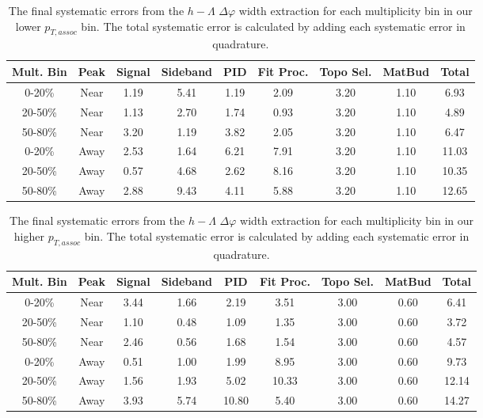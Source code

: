 \documentclass[ALICE,manyauthors]{ALICE_analysis_notes}
\begin{document}
\begin{table}[ht]
\centering
\begin{tabular}{|c|c||c|c|c|c|c|c||c|}
\hline
Mult. Bin & Peak & Signal & Sideband & PID & Fit Proc. & Topo Sel. & MatBud & Total \\
\hline
0-20\% & Near & 1.19 & 5.41 & 1.19 & 2.09 & 3.20 & 1.10 & 6.93 \\
20-50\% & Near & 1.13 & 2.70 & 1.74 & 0.93 & 3.20 & 1.10 & 4.89 \\
50-80\% & Near & 3.20 & 1.19 & 3.82 & 2.05 & 3.20 & 1.10 & 6.47 \\
0-20\% & Away & 2.53 & 1.64 & 6.21 & 7.91 & 3.20 & 1.10 & 11.03 \\
20-50\% & Away & 0.57 & 4.68 & 2.62 & 8.16 & 3.20 & 1.10 & 10.35 \\
50-80\% & Away & 2.88 & 9.43 & 4.11 & 5.88 & 3.20 & 1.10 & 12.65 \\ 
\hline
\end{tabular}
\caption{The final systematic errors from the $h-\Lambda$ $\Delta\varphi$ width extraction  for each multiplicity bin in our lower $p_{T, assoc}$ bin. The total systematic error is calculated by adding each systematic error in quadrature.}
\label{h_lambda_width_systematic_table_lowpt}
\end{table}

\begin{table}[ht]
\centering
\begin{tabular}{|c|c||c|c|c|c|c|c||c|}
\hline
Mult. Bin & Peak & Signal & Sideband & PID & Fit Proc. & Topo Sel. & MatBud & Total \\
\hline
0-20\% & Near & 3.44 & 1.66 & 2.19 & 3.51 & 3.00 & 0.60 & 6.41 \\
20-50\% & Near & 1.10 & 0.48 & 1.09 & 1.35 & 3.00 & 0.60 & 3.72 \\
50-80\% & Near & 2.46 & 0.56 & 1.68 & 1.54 & 3.00 & 0.60 & 4.57 \\
0-20\% & Away & 0.51 & 1.00 & 1.99 & 8.95 & 3.00 & 0.60 & 9.73 \\
20-50\% & Away & 1.56 & 1.93 & 5.02 & 10.33 & 3.00 & 0.60 & 12.14 \\
50-80\% & Away & 3.93 & 5.74 & 10.80 & 5.40 & 3.00 & 0.60 & 14.27 \\ 
\hline
\end{tabular}
\caption{The final systematic errors from the $h-\Lambda$ $\Delta\varphi$ width extraction  for each multiplicity bin in our higher $p_{T, assoc}$ bin. The total systematic error is calculated by adding each systematic error in quadrature.}
\label{h_lambda_width_systematic_table_highpt}
\end{table}
\end{document}
